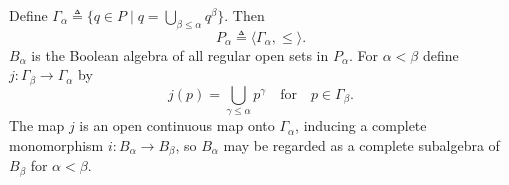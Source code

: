 Define $\Gamma_\alpha \triangleq \{q \in P \mid q = \bigcup_{\beta \leq \alpha} q^\beta\}$. Then
$$P_\alpha \triangleq \langle \Gamma_\alpha, \leq \rangle.$$
$B_\alpha$ is the Boolean algebra of all regular open sets in $P_\alpha$. For $\alpha < \beta$ define $j: \Gamma_\beta \rightarrow \Gamma_\alpha$ by
$$j(p) = \bigcup_{\gamma \leq \alpha} p^\gamma \quad \text{for} \quad p \in \Gamma_\beta.$$
The map $j$ is an open continuous map onto $\Gamma_\alpha$, inducing a complete monomorphism $i: B_\alpha \rightarrow B_\beta$, so $B_\alpha$ may be regarded as a complete subalgebra of $B_\beta$ for $\alpha < \beta$.
